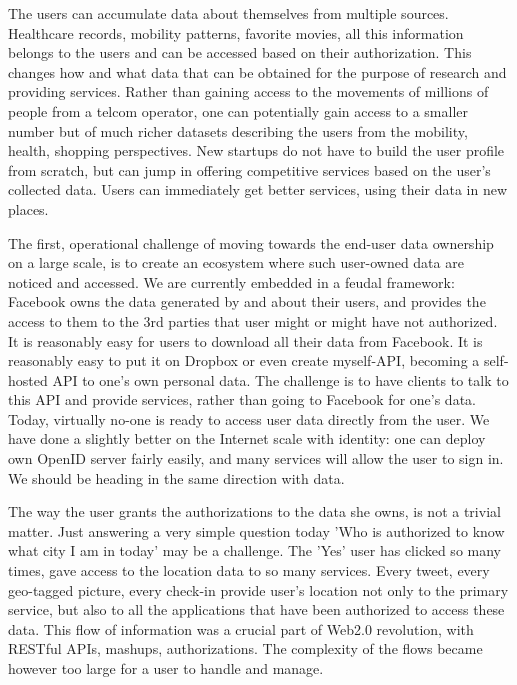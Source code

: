 The users can accumulate data about themselves from multiple sources. 
Healthcare records, mobility patterns, favorite movies, all this information belongs to the users and can be accessed based on their authorization.
This changes how and what data that can be obtained for the purpose of research and providing services.
Rather than gaining access to the movements of millions of people from a telcom operator, one can potentially gain access to a smaller number but of much richer datasets describing the users from the mobility, health, shopping  perspectives.
New startups do not have to build the user profile from scratch, but can jump in offering competitive services based on the user's collected data.
Users can immediately get better services, using their data in new places.

The first, operational challenge of moving towards the end-user data ownership on a large scale, is to create an ecosystem where such user-owned data are noticed and accessed.
We are currently embedded in a feudal framework: Facebook owns the data generated by and about their users, and provides the access to them to the 3rd parties that user might or might have not authorized. 
It is reasonably easy for users to download all their data from Facebook. 
It is reasonably easy to put it on Dropbox or even create myself-API, becoming a self-hosted API to one's own personal data. 
The challenge is to have clients to talk to this API and provide services, rather than going to Facebook for one's data. 
Today, virtually no-one is ready to access user data directly from the user. 
We have done a slightly better on the Internet scale with identity: one can deploy own OpenID server fairly easily, and many services will allow the user to sign in. We should be heading in the same direction with data.

The way the user grants the authorizations to the data she owns, is not a trivial matter.
Just answering a very simple question today 'Who is authorized to know what city I am in today' may be a challenge.
The 'Yes' user has clicked so many times, gave access to the location data to so many services.
Every tweet, every geo-tagged picture, every check-in provide user's location not only to the primary service, but also to all the applications that have been authorized to access these data.
This flow of information was a crucial part of Web2.0 revolution, with RESTful APIs, mashups, authorizations.
The complexity of the flows became however too large for a user to handle and manage.

